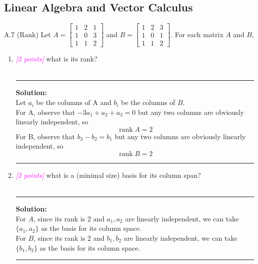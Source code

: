 \documentclass{article}
\newcommand{\1}{\mathbf{1}}
\DeclareMathOperator{\rank}{rank}
\newcommand{\points}[1]{\small\textcolor{magenta}{\emph{[#1 points]}} \normalsize}
\begin{document}
\subsection*{Linear Algebra and Vector Calculus}
A.7 (Rank) Let $A = \begin{bmatrix} 1 & 2 & 1 \\ 1 & 0 & 3 \\ 1 & 1 & 2 \end{bmatrix}$ and $B = \begin{bmatrix} 1 & 2 & 3 \\ 1 & 0 & 1 \\ 1 & 1 & 2 \end{bmatrix}$.
For each matrix $A$ and $B$,
\begin{enumerate} 
	\item \points{2} what is its rank?\\
\\
    \noindent\rule{\textwidth}{1pt}
    {\bf Solution:}\\
    Let $a_i$ be the columns of A and $b_i$ be the columns of $B$.\\
    For A, observe that $-3a_1 + a_2 + a_3 = 0$ but any two columns are obviously linearly independent, so 
    $$
    \boxed{\rank{A} = 2}
    $$
    For B, observe that $b_3 - b_2 = b_1$ but any two columns are obviously linearly independent, so 
    $$
    \boxed{\rank{B} = 2}
    $$
    \noindent\rule{\textwidth}{1pt}
	\item \points{2} what is a (minimal size) basis for its column span?\\
\\
    \noindent\rule{\textwidth}{1pt}
    {\bf Solution:}\\
    For $A$, since its rank is 2 and $a_1, a_2$ are linearly independent, we can take $\{a_1, a_2\}$ as the basis for its column space.\\
    For $B$, since its rank is 2 and $b_1, b_2$ are linearly independent, we can take $\{b_1, b_2\}$ as the basis for its column space.
    
    \noindent\rule{\textwidth}{1pt}
\end{enumerate}
\end{document}
